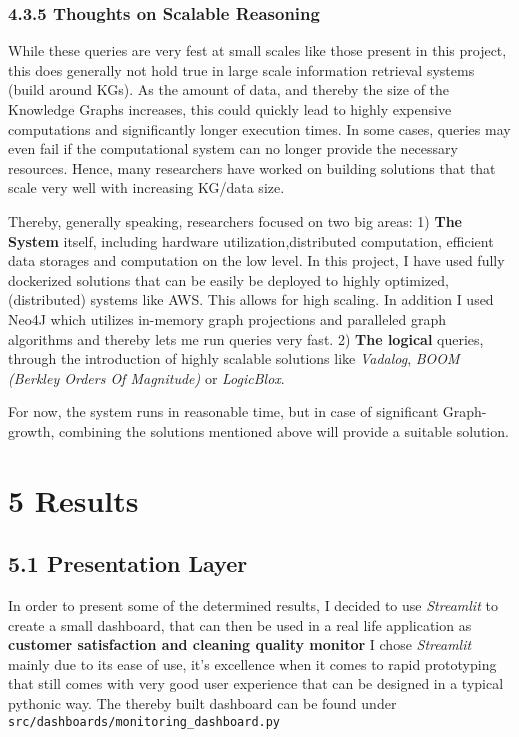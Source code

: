\subsubsection{4.3.5 Thoughts on Scalable
Reasoning}\label{thoughts-on-scalable-reasoning}

While these queries are very fest at small scales like those present in
this project, this does generally not hold true in large scale
information retrieval systems (build around KGs). As the amount of data,
and thereby the size of the Knowledge Graphs increases, this could
quickly lead to highly expensive computations and significantly longer
execution times. In some cases, queries may even fail if the
computational system can no longer provide the necessary resources.
Hence, many researchers have worked on building solutions that that
scale very well with increasing KG/data size.

Thereby, generally speaking, researchers focused on two big areas: 1)
\textbf{The System} itself, including hardware utilization,distributed
computation, efficient data storages and computation on the low level.
In this project, I have used fully dockerized solutions that can be
easily be deployed to highly optimized, (distributed) systems like AWS.
This allows for high scaling. In addition I used Neo4J which utilizes
in-memory graph projections and paralleled graph algorithms and thereby
lets me run queries very fast. 2) \textbf{The logical} queries, through
the introduction of highly scalable solutions like \emph{Vadalog},
\emph{BOOM (Berkley Orders Of Magnitude)} or \emph{LogicBlox}.

For now, the system runs in reasonable time, but in case of significant
Graph-growth, combining the solutions mentioned above will provide a
suitable solution.

\section{5 Results}\label{results-1}

\subsection{5.1 Presentation Layer}\label{presentation-layer}

In order to present some of the determined results, I decided to use
\emph{Streamlit} to create a small dashboard, that can then be used in a
real life application as \textbf{customer satisfaction and cleaning
quality monitor} I chose \emph{Streamlit} mainly due to its ease of use,
it's excellence when it comes to rapid prototyping that still comes with
very good user experience that can be designed in a typical pythonic
way. The thereby built dashboard can be found under
\texttt{src/dashboards/monitoring\_dashboard.py}

